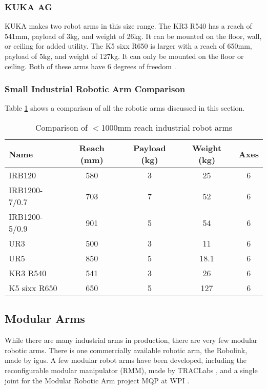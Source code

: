 \subsubsection{KUKA AG}
KUKA makes two robot arms in this size range. The KR3 R540 has a reach of 541mm, payload of 3kg, and weight of 26kg. It can be mounted on the floor, wall, or ceiling for added utility. The K5 sixx R650 is larger with a reach of 650mm, payload of 5kg, and weight of 127kg. It can only be mounted on the floor or ceiling. Both of these arms have 6 degrees of freedom \cite{RobotWorx}.

\subsubsection{Small Industrial Robotic Arm Comparison}
Table \ref{tab:ArmComparison} shows a comparison of all the robotic arms discussed in this section.
\begin{table} [H]
	\centering
	\begin{tabular}{| l | c | c | c | c |}
		\hline
		\textbf{Name} & \textbf{Reach (mm)} & \textbf{Payload (kg)} & \textbf{Weight (kg)} & \textbf{Axes} \\
		\hline
		IRB120 & 580 & 3 & 25 & 6 \\
		IRB1200-7/0.7 & 703 & 7 & 52 & 6 \\
		IRB1200-5/0.9 & 901 & 5 & 54 & 6 \\
		UR3 & 500 & 3 & 11 & 6 \\
		UR5 & 850 & 5 & 18.1 & 6 \\
		KR3 R540 & 541 & 3 & 26 & 6 \\
		K5 sixx R650 & 650 & 5 & 127 & 6 \\
		\hline
	\end{tabular}
	\caption{Comparison of $<$1000mm reach industrial robot arms}
	\label{tab:ArmComparison}
\end{table}

\subsection{Modular Arms}
While there are many industrial arms in production, there are very few modular robotic arms. There is one commercially available robotic arm, the Robolink, made by igus. A few modular robot arms have been developed, including the reconfigurable modular manipulator (RMM), made by TRACLabs \cite{RMM}, and a single joint for the Modular Robotic Arm project MQP at WPI \cite{MRA}.

